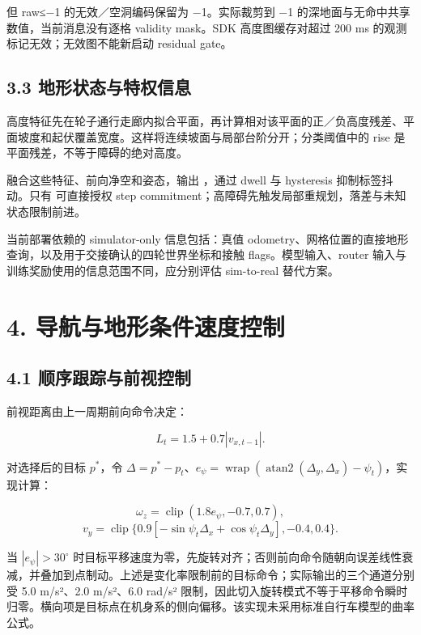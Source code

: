 \documentclass[
  10pt,
  a4paper,
]{article}
\begin{document}
但 raw≤−1 的无效／空洞编码保留为 −1。实际裁剪到 −1
的深地面与无命中共享数值，当前消息没有逐格 validity mask。SDK
高度图缓存对超过 200 ms 的观测标记无效；无效图不能新启动 residual gate。

\subsection{3.3
地形状态与特权信息}\label{ux5730ux5f62ux72b6ux6001ux4e0eux7279ux6743ux4fe1ux606f}

高度特征先在轮子通行走廊内拟合平面，再计算相对该平面的正／负高度残差、平面坡度和起伏覆盖宽度。这样将连续坡面与局部台阶分开；分类阈值中的
rise 是平面残差，不等于障碍的绝对高度。

{\ttfamily\small{}}
融合这些特征、前向净空和姿态，输出
{\ttfamily\small{}}，通过
dwell 与 hysteresis 抑制标签抖动。只有
{\ttfamily\small{}} 可直接授权 step
commitment；高障碍先触发局部重规划，落差与未知状态限制前进。

当前部署依赖的 simulator-only 信息包括：真值
odometry、网格位置的直接地形查询，以及用于交接确认的四轮世界坐标和接触
flags。模型输入、router 输入与训练奖励使用的信息范围不同，应分别评估
sim-to-real 替代方案。

\FloatBarrier

\section{4.
导航与地形条件速度控制}\label{ux5bfcux822aux4e0eux5730ux5f62ux6761ux4ef6ux901fux5ea6ux63a7ux5236}

\subsection{4.1
顺序跟踪与前视控制}\label{ux987aux5e8fux8ddfux8e2aux4e0eux524dux89c6ux63a7ux5236}

前视距离由上一周期前向命令决定：

\[
L_t=1.5+0.7|v_{x,t-1}|.
\]

对选择后的目标 \(p^*\)，令
\(\Delta=p^*-p_t\)、\(e_\psi=\operatorname{wrap}(\operatorname{atan2}(\Delta_y,\Delta_x)-\psi_t)\)，实现计算：

\[
\omega_z=\operatorname{clip}(1.8e_\psi,-0.7,0.7),
\] \[
v_y=\operatorname{clip}\{0.9[-\sin\psi_t\Delta_x+\cos\psi_t\Delta_y],-0.4,0.4\}.
\]

当 \(|e_\psi|>30^\circ\)
时目标平移速度为零，先旋转对齐；否则前向命令随朝向误差线性衰减，并叠加到点制动。上述是变化率限制前的目标命令；实际输出的三个通道分别受
5.0 m/s²、2.0 m/s²、6.0 rad/s²
限制，因此切入旋转模式不等于平移命令瞬时归零。横向项是目标点在机身系的侧向偏移。该实现未采用标准自行车模型的曲率公式。
\end{document}
